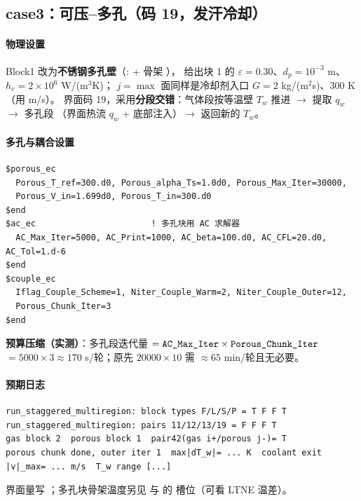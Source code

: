 \subsection{case3：可压--多孔（码 19，发汗冷却）}
\paragraph{物理设置}
Block1 改为\textbf{不锈钢多孔壁}（:  + 骨架 ），
 给出块 1 的 $\varepsilon=0.30$、$d_p=10^{-3}$ m、$h_v=2\times10^{6}$ W/(m$^3$K)；
$j=\max$ 面同样是冷却剂入口 $G=2$ kg/(m$^2$s)、300 K（用  m/s）。
界面码 19，采用\textbf{分段交错}：气体段按等温壁 $T_w$ 推进 $\to$ 提取 $q_w$ $\to$ 多孔段
（界面热流 $q_w$ + 底部注入）$\to$ 返回新的 $T_w$。

\paragraph{多孔与耦合设置}
\begin{lstlisting}
$porous_ec
  Porous_T_ref=300.d0, Porous_alpha_Ts=1.0d0, Porous_Max_Iter=30000,
  Porous_V_in=1.699d0, Porous_T_in=300.d0
$end
$ac_ec                       ! 多孔块用 AC 求解器
  AC_Max_Iter=5000, AC_Print=1000, AC_beta=100.d0, AC_CFL=20.d0, AC_Tol=1.d-6
$end
$couple_ec
  Iflag_Couple_Scheme=1, Niter_Couple_Warm=2, Niter_Couple_Outer=12,
  Porous_Chunk_Iter=3
$end
\end{lstlisting}
\textbf{预算压缩（实测）}：多孔段迭代量 $=\texttt{AC\_Max\_Iter}\times\texttt{Porous\_Chunk\_Iter}$
$=5000\times3\approx170$ s/轮；原先 $20000\times10$ 需 $\approx65$ min/轮且无必要。

\paragraph{预期日志}
\begin{lstlisting}
run_staggered_multiregion: block types F/L/S/P = T F F T
run_staggered_multiregion: pairs 11/12/13/19 = F F F T
gas block 2  porous block 1  pair42(gas i+/porous j-)= T
porous chunk done, outer iter 1  max|dT_w|= ... K  coolant exit |v|_max= ... m/s  T_w range [...]
\end{lstlisting}
界面量写 ；多孔块骨架温度另见  与
 的  槽位（可看 LTNE 温差）。

